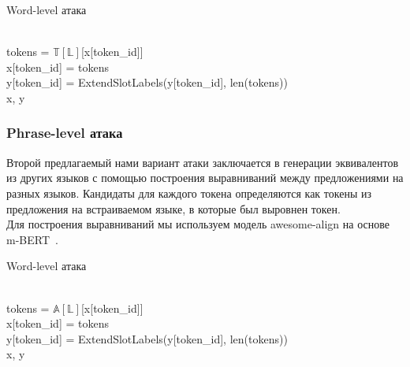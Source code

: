 \begin{algorithm}
    \caption{Word-level атака}
    \begin{algorithmic}
            \ind{}
                    \\
                    \ind\ind tokens = $\mathbb{T}[\mathbb{L}]$[x[token\_id]]\\
                    \ind\ind x[token\_id] = tokens\\
                    \ind\ind y[token\_id] = ExtendSlotLabels(y[token\_id], len(tokens))
            \EndIf \\
            \ind\Return x, y
        \EndFunction
    \end{algorithmic}\label{alg:algorithm1}
\end{algorithm}


\subsubsection{Phrase-level атака}
Второй предлагаемый нами вариант атаки заключается в генерации эквивалентов из других языков с помощью построения выравниваний между предложениями на разных языков.
Кандидаты для каждого токена определяются как токены из предложения на встраиваемом языке, в которые был выровнен токен. \\
Для построения выравниваний мы используем модель awesome-align на основе m-BERT~\cite{Dou2021WordAB}.

\begin{algorithm}
    \caption{Word-level атака}
    \begin{algorithmic}
            \ind{}
                    \\
                    \ind\ind tokens = $\mathbb{A}[\mathbb{L}]$[x[token\_id]]\\
                    \ind\ind x[token\_id] = tokens\\
                    \ind\ind y[token\_id] = ExtendSlotLabels(y[token\_id], len(tokens))
            \EndIf \\
            \ind\Return x, y
        \EndFunction
    \end{algorithmic}\label{alg:algorithm2}
\end{algorithm}

